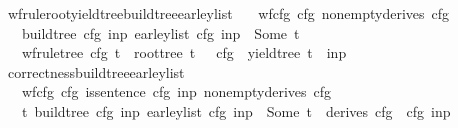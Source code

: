 \begin{isabellebody}
%
\isadelimproof
\isanewline
%
\endisadelimproof
{}\isamarkupfalse%
\ wf{\isacharunderscore}{\kern0pt}rule{\isacharunderscore}{\kern0pt}root{\isacharunderscore}{\kern0pt}yield{\isacharunderscore}{\kern0pt}tree{\isacharunderscore}{\kern0pt}build{\isacharunderscore}{\kern0pt}tree{\isacharunderscore}{\kern0pt}earley{\isacharunderscore}{\kern0pt}list{\isacharcolon}{\kern0pt}\isanewline
\ \ \ {\isachardoublequoteopen}wf{\isacharunderscore}{\kern0pt}cfg\ cfg{\isachardoublequoteclose}\ {\isachardoublequoteopen}nonempty{\isacharunderscore}{\kern0pt}derives\ cfg{\isachardoublequoteclose}\isanewline
\ \ \ {\isachardoublequoteopen}build{\isacharunderscore}{\kern0pt}tree\ cfg\ inp\ {\isacharparenleft}{\kern0pt}earley{\isacharunderscore}{\kern0pt}list\ cfg\ inp{\isacharparenright}{\kern0pt}\ {\isacharequal}{\kern0pt}\ Some\ t{\isachardoublequoteclose}\isanewline
\ \ \ {\isachardoublequoteopen}wf{\isacharunderscore}{\kern0pt}rule{\isacharunderscore}{\kern0pt}tree\ cfg\ t\ {\isasymand}\ root{\isacharunderscore}{\kern0pt}tree\ t\ {\isacharequal}{\kern0pt}\ {\isasymSS}\ cfg\ {\isasymand}\ yield{\isacharunderscore}{\kern0pt}tree\ t\ {\isacharequal}{\kern0pt}\ inp{\isachardoublequoteclose}%
\isadelimproof
%
\endisadelimproof
%
\isatagproof
%
\endisatagproof
{\isafoldproof}%
%
\isadelimproof
\isanewline
%
\endisadelimproof
{}\isamarkupfalse%
\ correctness{\isacharunderscore}{\kern0pt}build{\isacharunderscore}{\kern0pt}tree{\isacharunderscore}{\kern0pt}earley{\isacharunderscore}{\kern0pt}list{\isacharcolon}{\kern0pt}\isanewline
\ \ \ {\isachardoublequoteopen}wf{\isacharunderscore}{\kern0pt}cfg\ cfg{\isachardoublequoteclose}\ {\isachardoublequoteopen}is{\isacharunderscore}{\kern0pt}sentence\ cfg\ inp{\isachardoublequoteclose}\ {\isachardoublequoteopen}nonempty{\isacharunderscore}{\kern0pt}derives\ cfg{\isachardoublequoteclose}\isanewline
\ \ \ {\isachardoublequoteopen}{\isacharparenleft}{\kern0pt}{\isasymexists}t{\isachardot}{\kern0pt}\ build{\isacharunderscore}{\kern0pt}tree\ cfg\ inp\ {\isacharparenleft}{\kern0pt}earley{\isacharunderscore}{\kern0pt}list\ cfg\ inp{\isacharparenright}{\kern0pt}\ {\isacharequal}{\kern0pt}\ Some\ t{\isacharparenright}{\kern0pt}\ {\isasymlongleftrightarrow}\ derives\ cfg\ {\isacharbrackleft}{\kern0pt}{\isasymSS}\ cfg{\isacharbrackright}{\kern0pt}\ inp{\isachardoublequoteclose}%
\isadelimproof
%
\endisadelimproof
%
\isatagproof
%
\endisatagproof
{\isafoldproof}%
%
\isadelimproof
%
\endisadelimproof
%
\isadelimdocument

\end{isabellebody}
